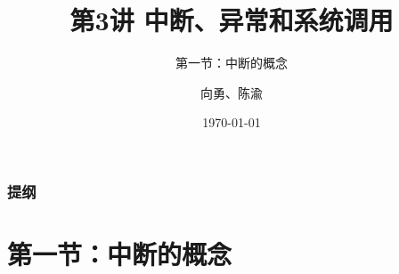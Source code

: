 


\title[第3讲]{第3讲 中断、异常和系统调用} %
\subtitle{第一节：中断的概念}
\author{向勇、陈渝} %
\date{\today} %



\begin{frame}
\titlepage %
\end{frame}

\begin{frame}
\frametitle{提纲} %
\tableofcontents %
\end{frame}


\section{第一节：中断的概念}%

